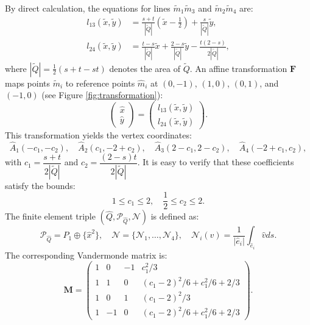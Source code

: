 \documentclass[a4paper,11pt,fleqn]{article}
\numberwithin{equation}{section}
\begin{document}
By direct calculation, the equations for lines $\tilde{m}_1\tilde{m}_3$ and $\tilde{m}_2\tilde{m}_4$ are:
\begin{align}
	l_{13}(\tilde{x},\tilde{y}) &= \frac{s + t}{|\tilde{Q}|}(\tilde{x} - \frac{1}{2}) + \frac{s}{|\tilde{Q}|}\tilde{y}, \label{eq:l13} \\
	l_{24}(\tilde{x},\tilde{y}) &= \frac{t - s}{|\tilde{Q}|}\tilde{x} + \frac{2 - s}{|\tilde{Q}|}\tilde{y} - \frac{t(2 - s)}{2|\tilde{Q}|}, \label{eq:l24}
\end{align}
where $|\tilde{Q}| = \frac{1}{2}(s + t - st)$ denotes the area of $\tilde{Q}$. An affine transformation $\bm{F}$ maps points $\tilde{m}_i$ to reference points $\hat{m}_i$ at $(0,-1)$, $(1,0)$, $(0,1)$, and $(-1,0)$ (see Figure \ref{fig:transformation}):
\begin{equation*}
	\begin{pmatrix} \hat{x} \\ \hat{y} \end{pmatrix} = 
	\begin{pmatrix} l_{13}(\tilde{x},\tilde{y}) \\ l_{24}(\tilde{x},\tilde{y}) \end{pmatrix}.
\end{equation*}
This transformation yields the vertex coordinates:
\begin{equation*}\label{eq:transformed-vertices}
	\hat{A}_1(-c_1, -c_2), \quad \hat{A}_2(c_1, -2+c_2), \quad \hat{A}_3(2 - c_1, 2-c_2), \quad \hat{A}_4(-2+c_1, c_2),
\end{equation*}
with $c_1 = \dfrac{s + t}{2|\tilde{Q}|}$ and $c_2 = \dfrac{(2 - s)t}{2|\tilde{Q}|}$. It is easy to verify that these coefficients satisfy the bounds:
\begin{equation*}
	1 \leq c_1 \leq 2, \quad \frac{1}{2} \leq c_2 \leq 2.	
\end{equation*}
The finite element triple $(\hat{Q}, \mathcal{P}_{\hat{Q}}, \mathcal{N})$ is defined as:
\begin{equation}\label{def:FE}
	\mathcal{P}_{\hat{Q}} = P_1 \oplus \{\hat{x}^2\}, \quad
	\mathcal{N} = \{\mathcal{N}_1, \dots, \mathcal{N}_4\}, \quad \mathcal{N}_i(\hat{v}) = \frac{1}{|\hat{e}_i|}\int_{\hat{e}_i}\hat{v}  ds.
\end{equation}
The corresponding Vandermonde matrix is:
\begin{equation}
	\bm{M} = \begin{pmatrix}
		1 &  0 & -1 &  c_1^2/3 \\
		1 &  1 &  0 &  (c_1 - 2)^2/6 + c_1^2/6 + 2/3 \\
		1 &  0 &  1 &  (c_1 - 2)^2/3 \\
		1 & -1 &  0 &  (c_1 - 2)^2/6 + c_1^2/6 + 2/3 
	\end{pmatrix}.
\end{equation}
\end{document}
